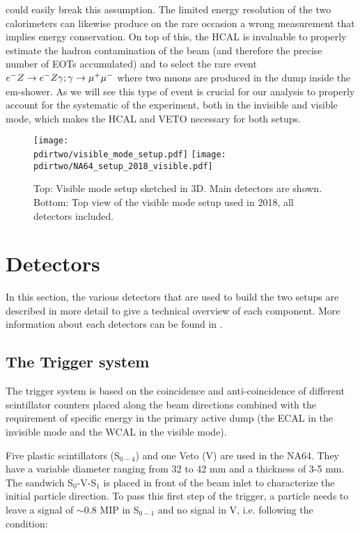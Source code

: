 could easily break this assumption. The limited energy resolution of the two calorimeters can likewise produce on the rare occasion a wrong measurement that implies energy conservation. On top of this, the HCAL is invaluable to properly estimate the hadron contamination of the beam (and therefore the precise number of EOTs accumulated) and to select the rare event $e^- Z \to e^- Z \gamma; \gamma \to \mu^+ \mu^-$ where two muons are produced in the dump inside the em-shower. As we will see this type of event is crucial for our analysis to properly account for the systematic of the experiment, both in the invisible and visible mode, which makes the HCAL and VETO necessary for both setups.

\begin{figure}[tb]
  \centering
  \texttt{[image: \\pdirtwo/visible\_mode\_setup.pdf]}  
  \texttt{[image: \\pdirtwo/NA64\_setup\_2018\_visible.pdf]}
  \caption[NA64 visible mode setup 2018]{Top: Visible mode setup sketched in 3D. Main detectors are shown. Bottom: Top view of the visible mode setup used in 2018, all detectors included.}
  \label{fig:setup-vis-2018}
\end{figure}

\section{Detectors}
\label{ch2:sec:detectors}

In this section, the various detectors that are used to build the two setups are described in more detail to give a technical overview of each component. More information about each detectors can be found in \cite{na64-hcal,na64-detectors,ABBON201569}. 

\subsection{The Trigger system}
\label{ch2:sec:detectors-trigger}

The trigger system is based on the coincidence and anti-coincidence of different scintillator counters placed along the beam directions combined with the requirement of specific energy in the primary active dump (the ECAL in the invisible mode and the WCAL in the visible mode).

Five plastic scintillators (S$_{0-4}$) and one Veto (V) are used in the NA64. They have a variable diameter ranging from 32 to 42 \si{mm} and a thickness of 3-5 \si{mm}. The sandwich S$_0$-V-S$_1$ is placed in front of the beam inlet to characterize the initial particle direction. To pass this first step of the trigger, a particle needs to leave a signal of $\sim$0.8 MIP in S$_{0-1}$ and no signal in V, i.e. following the condition:

